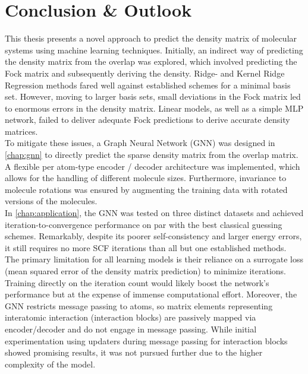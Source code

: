 \chapter{Conclusion \& Outlook}
\label{chap:conclusion}
This thesis presents a novel approach to predict the density matrix of molecular systems using machine learning techniques. 
Initially, an indirect way of predicting the density matrix from the overlap was explored, which involved predicting the Fock matrix and subsequently deriving the density. Ridge- and Kernel Ridge Regression methods fared well against established schemes for a minimal basis set. However, moving to larger basis sets, small deviations in the Fock matrix led to enormous errors in the density matrix. Linear models, as well as a simple MLP network, failed to deliver adequate Fock predictions to derive accurate density matrices.\\

To mitigate these issues, a Graph Neural Network (GNN) was designed in \autoref{chap:gnn} to directly predict the sparse density matrix from the overlap matrix. A flexible per atom-type encoder / decoder architecture was implemented, which allows for the handling of different molecule sizes. Furthermore, invariance to molecule rotations was ensured by augmenting the training data with rotated versions of the molecules. \\
In \autoref{chap:application}, the GNN was tested on three distinct datasets and achieved iteration-to-convergence performance on par with the best classical guessing schemes. Remarkably, despite its poorer self-consistency and larger energy errors, it still requires no more SCF iterations than all but one established methods.\\

The primary limitation for all learning models is their reliance on a surrogate loss (mean squared error of the density matrix prediction) to minimize iterations. Training directly on the iteration count would likely boost the network's performance but at the expense of immense computational effort. Moreover, the GNN restricts message passing to atoms, so matrix elements representing interatomic interaction (interaction blocks) are passively mapped via encoder/decoder and do not engage in message passing. While initial experimentation using updaters during message passing for interaction blocks showed promising results, it was not pursued further due to the higher complexity of the model.\\

